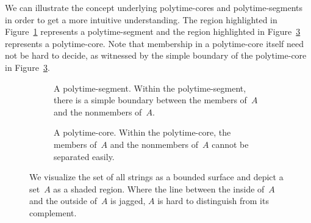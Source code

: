 \begin{example}
  We can illustrate the concept underlying polytime-cores and polytime-segments in order to get a more intuitive understanding.
  The region highlighted in Figure~\ref{fig:segmentcore:segment} represents a polytime-segment and the region highlighted in Figure~\ref{fig:segmentcore:core} represents a polytime-core.
  Note that membership in a polytime-core itself need not be hard to decide, as witnessed by the simple boundary of the polytime-core in Figure~\ref{fig:segmentcore:core}.
  \begin{figure}
    \centering
    \begin{subfigure}{0.4\textwidth}
      \centering
      \caption{
        A polytime-segment.
        Within the polytime-segment, there is a simple boundary between the members of~$A$ and the nonmembers of~$A$.
      }
      \label{fig:segmentcore:segment}
    \end{subfigure}
    \qquad
    \begin{subfigure}{0.4\textwidth}
      \centering
      \caption{
        A polytime-core.
        Within the polytime-core, the members of~$A$ and the nonmembers of~$A$ cannot be separated easily.
      }
      \label{fig:segmentcore:core}
    \end{subfigure}
    \caption{
      We visualize the set of all strings as a bounded surface and depict a set~$A$ as a shaded region.
      Where the line between the inside of~$A$ and the outside of~$A$ is jagged, $A$ is hard to distinguish from its complement.
    }
  \end{figure}
\end{example}

